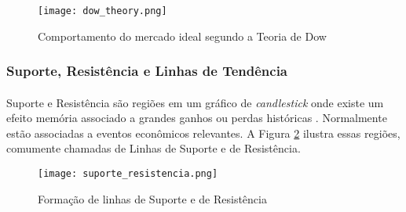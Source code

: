 \begin{figure}[h]
    \texttt{[image: dow\_theory.png]}
    \centering
    \caption{Comportamento do mercado ideal segundo a Teoria de Dow \cite{kirkpatrick2010technical}}
    \label{fig:2}
\end{figure}






\FloatBarrier
\subsubsection*{Suporte, Resistência e Linhas de Tendência}

\paragraph{} Suporte e Resistência são regiões em um gráfico de \textit{candlestick} onde existe um efeito memória associado a grandes ganhos ou perdas históricas \cite{moraes2007se}. Normalmente estão associadas a eventos econômicos relevantes. A Figura \ref{fig:3} ilustra essas regiões, comumente chamadas de Linhas de Suporte e de Resistência.

\begin{figure}[h]
    \texttt{[image: suporte\_resistencia.png]}
    \centering
    \caption{Formação de linhas de Suporte e de Resistência \cite{moraes2007se}}
    \label{fig:3}
\end{figure}

